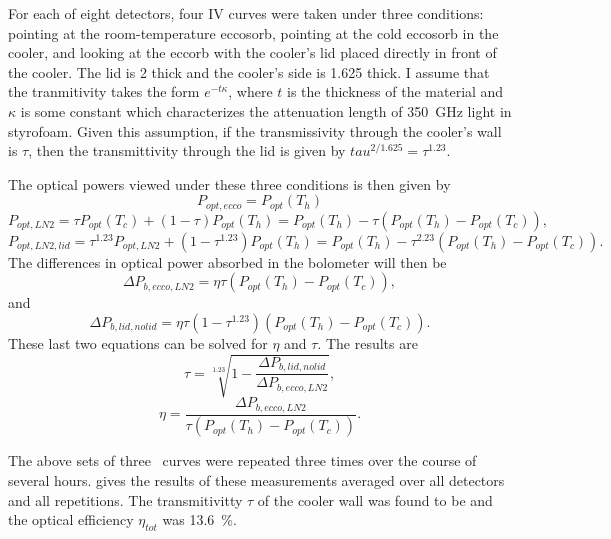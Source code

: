 For each of eight detectors, four IV curves were taken under three conditions: pointing at the room-temperature eccosorb, pointing at the cold eccosorb in the cooler, and looking at the eccorb with the cooler's lid placed directly in front of the cooler.
The lid is \SI{2}{\in} thick and the cooler's side is \SI{1.625}{\in} thick.
I assume that the tranmitivity takes the form $e^{-t \kappa}$, where $t$ is the thickness of the material and $\kappa$ is some constant which characterizes the attenuation length of \SI{350}{\GHz} light in styrofoam.
Given this assumption, if the transmissivity through the cooler's wall is $\tau$, then the transmittivity through the lid is given by $tau^{2/1.625} = \tau^{1.23}$.

The optical powers viewed under these three conditions is then given by
\begin{equation}
  P_{opt,ecco} = P_{opt}(T_h)
\end{equation}
\begin{equation}
  P_{opt,LN2} = \tau P_{opt}(T_c) + (1-\tau)P_{opt}(T_h) = P_{opt}(T_h) - \tau (P_{opt}(T_h) - P_{opt}(T_c)),
\end{equation}
\begin{equation}
  P_{opt,LN2,lid} = \tau^{1.23} P_{opt,LN2} + (1-\tau^{1.23})P_{opt}(T_h) = P_{opt}(T_h) - \tau^{2.23}(P_{opt}(T_h) - P_{opt}(T_c)) .
\end{equation}
The differences in optical power absorbed in the bolometer will then be
\begin{equation}
  \Delta P_{b,ecco,LN2} = \eta \tau (P_{opt}(T_h) - P_{opt}(T_c)),
\end{equation}
and
\begin{equation}
  \Delta P_{b,lid,no lid} = \eta \tau (1-\tau^{1.23}) (P_{opt}(T_h) - P_{opt}(T_c)).
\end{equation}
These last two equations can be solved for $\eta$ and $\tau$. The results are
\begin{equation}
   \tau = \sqrt[1.23]{1 - \frac{\Delta P_{b,lid,no lid}}{\Delta P_{b,ecco,LN2}}},
\end{equation}
\begin{equation}
   \eta = \frac{\Delta P_{b,ecco,LN2}}{ \tau ( P_{opt}(T_h) - P_{opt}(T_c) )} .
\end{equation}

The above sets of three \IV\ curves were repeated three times over the course of several hours.
 gives the results of these measurements averaged over all detectors and all repetitions.
The transmitivitty $\tau$ of the cooler wall was found to be  and the optical efficiency $\eta_{tot}$ was \SI{13.6}{\percent}. 

